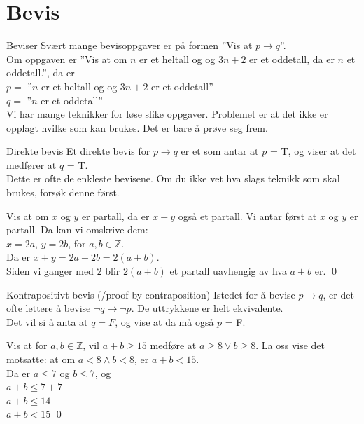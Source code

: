 \section{Bevis}

\begin{frame}{Beviser}
    Svært mange bevisoppgaver er på formen ''Vis at $p \rightarrow q$''.\\
    
    Om oppgaven er ''Vis at om $n$ er et heltall og og $3n+2$ er et oddetall, da er $n$ et oddetall.'', da er \\
    $p = $ ''$n$ er et heltall og og $3n+2$ er et oddetall'' \\
    $q = $ ''$n$ er et oddetall''\\
    
Vi har mange teknikker for løse slike oppgaver. Problemet er at det ikke er opplagt hvilke som kan brukes. Det er bare å prøve seg frem.
\end{frame}

\begin{frame}{Direkte bevis}
    Et direkte bevis for $p \rightarrow q$ er et som antar at $p$ = T, og viser at det medfører at $q$ = T.\\
    Dette er ofte de enkleste bevisene. Om du ikke vet hva slags teknikk som skal brukes, forsøk denne først.\\
    
    \pause
    \begin{block}{Vis at om $x$ og $y$ er partall, da er $x + y$ også et partall.}
        Vi antar først at $x$ og $y$ er partall. Da kan vi omskrive dem:\\
        $x = 2a$, $y = 2b$, for $a, b \in \mathbb{Z}$.\\
        Da er $x + y = 2a + 2b = 2(a + b)$.\\
        Siden vi ganger med $2$ blir $2(a + b)$ et partall uavhengig av hva $a + b$ er.
        \qed
    \end{block}
\end{frame}

\begin{frame}{Kontrapositivt bevis (/proof by contraposition)}
    Istedet for å bevise $p \rightarrow q$, er det ofte lettere å bevise $\lnot q \rightarrow \lnot p$. De uttrykkene er helt ekvivalente.\\
    Det vil si å anta at $q = F$, og vise at da må også $p$ = F.\\
    
    \pause
    \begin{block}{Vis at for $a, b \in \mathbb{Z}$, vil $a + b \geq 15$ medføre at $a \geq 8 \lor b \geq 8$.}
        La oss vise det motsatte: at om $a <8 \land b < 8$, er $a + b < 15$.\\
        Da er $a \leq 7$ og $b \leq 7$, og\\
        $a + b \leq 7 + 7$\\
        $a + b \leq 14$\\
        $a + b < 15$
        \qed
    \end{block}
\end{frame}

